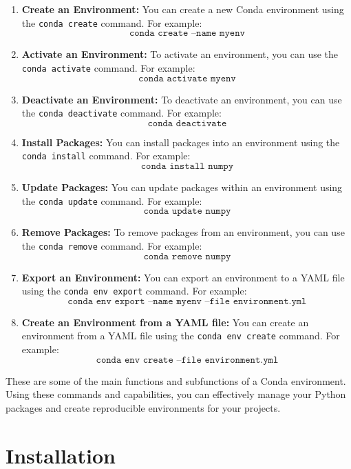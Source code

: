 \begin{enumerate}
	\item \textbf{Create an Environment:} You can create a new Conda environment using the \texttt{conda create} command. For example:
	\[
	\texttt{conda create --name myenv}
	\]
	
	\item \textbf{Activate an Environment:} To activate an environment, you can use the \texttt{conda activate} command. For example:
	\[
	\texttt{conda activate myenv}
	\]
	
	\item \textbf{Deactivate an Environment:} To deactivate an environment, you can use the \texttt{conda deactivate} command. For example:
	\[
	\texttt{conda deactivate}
	\]
	
	\item \textbf{Install Packages:} You can install packages into an environment using the \texttt{conda install} command. For example:
	\[
	\texttt{conda install numpy}
	\]
	
	\item \textbf{Update Packages:} You can update packages within an environment using the \texttt{conda update} command. For example:
	\[
	\texttt{conda update numpy}
	\]
	
	\item \textbf{Remove Packages:} To remove packages from an environment, you can use the \texttt{conda remove} command. For example:
	\[
	\texttt{conda remove numpy}
	\]
	
	\item \textbf{Export an Environment:} You can export an environment to a YAML file using the \texttt{conda env export} command. For example:
	\[
	\texttt{conda env export --name myenv --file environment.yml}
	\]
	
	\item \textbf{Create an Environment from a YAML file:} You can create an environment from a YAML file using the \texttt{conda env create} command. For example:
	\[
	\texttt{conda env create --file environment.yml}
	\]
\end{enumerate}

These are some of the main functions and subfunctions of a Conda environment. Using these commands and capabilities, you can effectively manage your Python packages and create reproducible environments for your projects.

\section{Installation}


